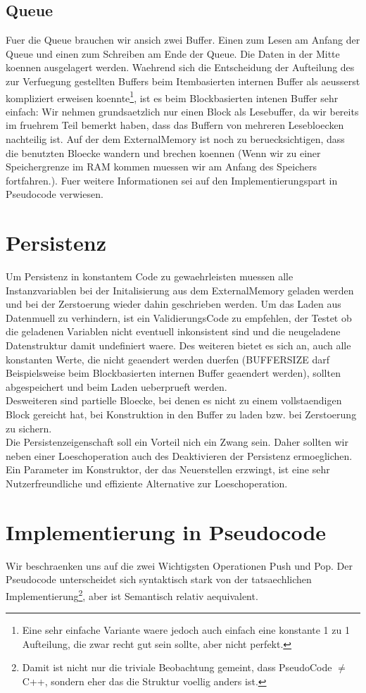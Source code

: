 \documentclass[10pt,a4paper]{article}
\begin{document}
\subsection{Queue}
Fuer die Queue brauchen wir ansich zwei Buffer. Einen zum Lesen am Anfang der Queue und einen zum Schreiben am Ende der Queue. Die Daten in der Mitte koennen ausgelagert werden. Waehrend sich die Entscheidung der Aufteilung des zur Verfuegung gestellten Buffers beim Itembasierten internen Buffer als aeusserst kompliziert erweisen koennte\footnote{Eine sehr einfache Variante waere jedoch auch einfach eine konstante 1 zu 1 Aufteilung, die zwar recht gut sein sollte, aber nicht perfekt.}, ist es beim Blockbasierten intenen Buffer sehr einfach: Wir nehmen grundsaetzlich nur einen Block als Lesebuffer, da wir bereits im fruehrem Teil bemerkt haben, dass das Buffern von mehreren Lesebloecken nachteilig ist. Auf der dem ExternalMemory ist noch zu beruecksichtigen, dass die benutzten Bloecke wandern und brechen koennen (Wenn wir zu einer Speichergrenze im RAM kommen muessen wir am Anfang des Speichers fortfahren.). Fuer weitere Informationen sei auf den Implementierungspart in Pseudocode verwiesen.
\section{Persistenz}
Um Persistenz in konstantem Code zu gewaehrleisten muessen alle Instanzvariablen bei der Initalisierung aus dem ExternalMemory geladen werden und bei der Zerstoerung wieder dahin geschrieben werden. Um das Laden aus Datenmuell zu verhindern, ist ein ValidierungsCode zu empfehlen, der Testet ob die geladenen Variablen nicht eventuell inkonsistent sind und die neugeladene Datenstruktur damit undefiniert waere. Des weiteren bietet es sich an, auch alle konstanten Werte, die nicht geaendert werden duerfen (BUFFERSIZE darf Beispielsweise beim Blockbasierten internen Buffer geaendert werden), sollten abgespeichert und beim Laden ueberprueft werden.\\
Desweiteren sind partielle Bloecke, bei denen es nicht zu einem vollstaendigen Block gereicht hat, bei Konstruktion in den Buffer zu laden bzw. bei Zerstoerung zu sichern. \\
Die Persistenzeigenschaft soll ein Vorteil nich ein Zwang sein. Daher sollten wir neben einer Loeschoperation auch des Deaktivieren der Persistenz ermoeglichen. Ein Parameter im Konstruktor, der das Neuerstellen erzwingt, ist eine sehr Nutzerfreundliche und effiziente Alternative zur Loeschoperation.
\section{Implementierung in Pseudocode}
Wir beschraenken uns auf die zwei Wichtigsten Operationen Push und Pop. Der Pseudocode unterscheidet sich syntaktisch stark von der tatsaechlichen Implementierung\footnote{Damit ist nicht nur die triviale Beobachtung gemeint, dass PseudoCode $\neq$ C++, sondern eher das die Struktur voellig anders ist.}, aber ist Semantisch relativ aequivalent.
\end{document}
